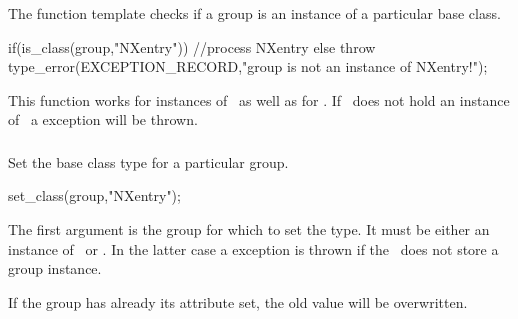 \subsubsection{}

\subsubsection{}

The  function template checks if a group is an instance of a
particular base class. 
\begin{cppcode}
if(is_class(group,"NXentry"))
    //process NXentry
else
    throw type_error(EXCEPTION_RECORD,"group is not an instance of NXentry!");
\end{cppcode}
This function works for instances of \nxgroup\ as well as for \nxobject.  If
\nxobject\ does not hold an instance of \nxgroup\ a  exception
will be thrown.

\subsubsection{}

Set the base class type for a particular group. 
\begin{cppcode}
set_class(group,"NXentry");
\end{cppcode}
The first argument is the group for which to set the type. It must be either an
instance of \nxgroup\ or \nxobject. In the latter case a 
exception is thrown if the \nxobject\ does not store a group instance.

If the group has already its  attribute set, the old value will be
overwritten.
